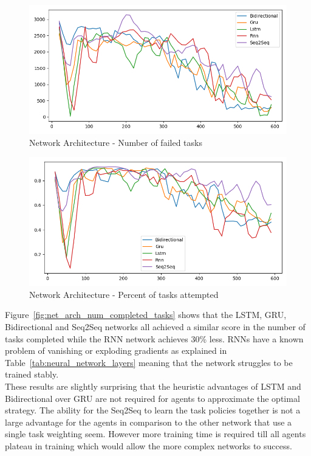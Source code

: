 \begin{figure}[H]
    \centering
    \includegraphics[width=\linewidth]{figures/5_evaluation_figs/net_arch_training_fig/num_failed_tasks.png}
    \caption{Network Architecture - Number of failed tasks}
    \label{fig:net_arch_num_failed_tasks}
\end{figure}

\begin{figure}[H]
    \centering
    \includegraphics[width=\linewidth]{figures/5_evaluation_figs/net_arch_training_fig/percent_tasks.png}
    \caption{Network Architecture - Percent of tasks attempted}
    \label{fig:net_arch_percent_tasks}
\end{figure}

Figure~\ref{fig:net_arch_num_completed_tasks} shows that the LSTM, GRU, Bidirectional and Seq2Seq networks all
achieved a similar score in the number of tasks completed while the RNN network achieves 30\% less. RNNs have a known
problem of vanishing or exploding gradients as explained in Table~\ref{tab:neural_network_layers} meaning that
the network struggles to be trained stably. \\
These results are slightly surprising that the heuristic advantages of LSTM and Bidirectional over GRU are not required
for agents to approximate the optimal strategy. The ability for the Seq2Seq to learn the task policies together is not
a large advantage for the agents in comparison to the other network that use a single task weighting seem. However
more training time is required till all agents plateau in training which would allow the more complex networks to
success.
